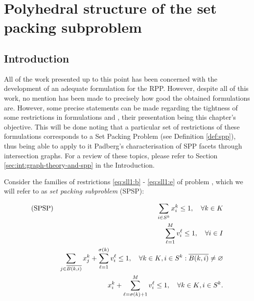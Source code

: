\chapter{Polyhedral structure of the set packing subproblem}
\label{chp:spp}

\section{Introduction} %
\label{sec:spp:introduction}

All of the work presented up to this point has been concerned with the
development of an adequate formulation for the RPP. However, despite all of this
work, no mention has been made to precisely how good the obtained formulations
are. However, some precise statements can be made regarding the tightness of
some restrictions in formulations \slla and \sllb, their presentation being this
chapter's objective. This will be done noting that a particular set of
restrictions of these formulations corresponds to a Set Packing Problem (see
Definition \ref{def:spp}), thus being able to apply to it Padberg's
characterisation of SPP facets through intersection graphs. For a review of
these topics, please refer to Section \ref{sec:int:graph-theory-and-spp} in the
Introduction.

Consider the families of restrictions \eqref{eq:sll1:b} - \eqref{eq:sll1:e} of
problem \slla, which we will refer to as \emph{set packing subproblem} (SPSP):

{
    \newcommand{\bover} {\overline{B(k, i)}}
    \newcommand{\bne}   {\bover\neq\varnothing}
    \newcommand{\sumi}  {\sum_{\is}}
    \newcommand{\sumlm} {\sum_{\ell=1}^{M}}
    \newcommand{\sumj}  {\sum_{j\in\bover}}
    \newcommand{\sumls} {\sum_{\ell=1}^{\sigma(k)}}
    \newcommand{\sumlsm}{\sum_{\ell=\sigma(k)+1}^{M}}
    
    \begin{eqnarray}
        \rm{(SPSP)}
            &    & \sumi  x_i^k                \leq 1, \quad\forall\kk
                                                            \label{eqn:spsp:a}\\
            &    & \sumlm v_i^\ell             \leq 1, \quad\forall\ii
                                                            \label{eqn:spsp:b}\\
            &    & \sumj x_j^k+\sumls v_i^\ell \leq 1, \quad\forall\kk,\is:\bne
                                                            \label{eqn:spsp:c}\\
            &    & x_i^k + \sumlsm v_i^\ell    \leq 1, \quad\forall\kk,\is.
                                                            \label{eqn:spsp:d}
    \end{eqnarray}
}

